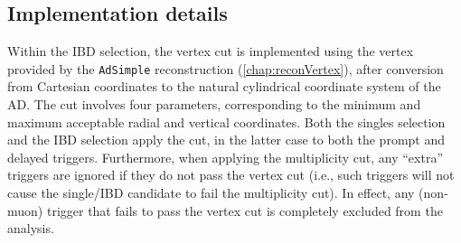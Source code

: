 \documentclass[../thesis.tex]{subfiles}
\begin{document}
\subsection{Implementation details}
\label{sec:cutVaryVtxCutImplDet}

Within the IBD selection, the vertex cut is implemented using the vertex provided by the \texttt{AdSimple} reconstruction (\autoref{chap:reconVertex}), after conversion from Cartesian coordinates to the natural cylindrical coordinate system of the AD. The cut involves four parameters, corresponding to the minimum and maximum acceptable radial and vertical coordinates. Both the singles selection and the IBD selection apply the cut, in the latter case to both the prompt and delayed triggers. Furthermore, when applying the multiplicity cut, any ``extra'' triggers are ignored if they do not pass the vertex cut (i.e., such triggers will not cause the single/IBD candidate to fail the multiplicity cut). In effect, any (non-muon) trigger that fails to pass the vertex cut is completely excluded from the analysis.

\begin{comment}
Before going into the details of the efficiency calculation, it is worthwhile to demonstrate \emph{why} it is worthwhile to carry it out in the first place. First, we must define some vertex cuts to investigate. \autoref{tab:cutVaryVtxCutCutsTbl} lists five cuts along with the names we will use when referring to them in the remainder of this chapter. Using those definitions, Fig.~XXX shows the best-fit oscillation parameters obtained when applying these cuts without any efficiency correction. We expect some scatter, given that we are analyzing statistically independent subsamples.\footnote{More precisely, the three vertical cuts are statistically independent from each other, and likewise for the two radial cuts, but there \emph{is} a degree of overlap between each vertical and each radial cut. The overall point remains, however.}. Since we know that roughly half of the fit's uncertainty comes from statistics (as discussed in XXX fitting chapter), and since the vertical (radial) cuts approximately divide the sample into thirds (halves), we can estimate the statistical uncertainty on each subsample to be between $0.5\sqrt{2}$ and $0.5\sqrt{3}$ of the total (full sample statistical + systematic) uncertainty, i.e. 70--85\% of the total error bar. From Fig~XXX, it is apparent that the scale of the scatter is slightly larger than 1$\sigma$. While a mere statistical fluctuation cannot be ruled out, this result suggests that we should attempt to determine whether an AD-dependent efficiency variation may be playing a role (in which case a correction should be applied). As we will shortly show, when we measure the vertex efficiency, we do in fact find different values among the ADs, and applying a correction indeed reduces the scatter between the fit results.
\end{comment}
\end{document}

